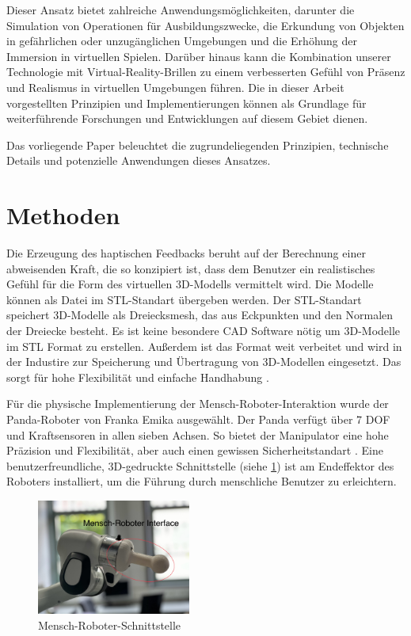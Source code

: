 \documentclass[conference]{IEEEtran}
\begin{document}
Dieser Ansatz bietet zahlreiche Anwendungsmöglichkeiten, darunter die Simulation von Operationen für Ausbildungszwecke, die Erkundung von Objekten in gefährlichen oder unzugänglichen Umgebungen und die Erhöhung der Immersion in virtuellen Spielen. Darüber hinaus kann die Kombination unserer Technologie mit Virtual-Reality-Brillen zu einem verbesserten Gefühl von Präsenz und Realismus in virtuellen Umgebungen führen. Die in dieser Arbeit vorgestellten Prinzipien und Implementierungen können als Grundlage für weiterführende Forschungen und Entwicklungen auf diesem Gebiet dienen.

Das vorliegende Paper beleuchtet die zugrundeliegenden Prinzipien, technische Details und potenzielle Anwendungen dieses Ansatzes.


\section{Methoden}
Die Erzeugung des haptischen Feedbacks beruht auf der Berechnung einer abweisenden Kraft, die so konzipiert ist, dass dem Benutzer ein realistisches Gefühl für die Form des virtuellen 3D-Modells vermittelt wird. Die Modelle können als Datei im STL-Standart übergeben werden. Der STL-Standart speichert 3D-Modelle als Dreiecksmesh, das aus Eckpunkten und den Normalen der Dreiecke besteht. Es ist keine besondere CAD Software nötig um 3D-Modelle im STL Format zu erstellen. Außerdem ist das Format weit verbeitet und wird in der Industire zur Speicherung und Übertragung von 3D-Modellen eingesetzt. Das sorgt für hohe Flexibilität und einfache Handhabung \autocite{WasIstSTLDatei2017}.

Für die physische Implementierung der Mensch-Roboter-Interaktion wurde der Panda-Roboter von Franka Emika ausgewählt. Der Panda verfügt über 7 DOF und Kraftsensoren in allen sieben Achsen. So bietet der Manipulator eine hohe Präzision und Flexibilität, aber auch einen gewissen Sicherheitstandart \cite{pandaDatasheet}. Eine benutzerfreundliche, 3D-gedruckte Schnittstelle (siehe \ref{fig:MRinterface}) ist am Endeffektor des Roboters installiert, um die Führung durch menschliche Benutzer zu erleichtern.  

\begin{figure}
    \centering
    \includegraphics[width=0.45\textwidth]{pics/interface.jpeg}
    \caption{Mensch-Roboter-Schnittstelle}
    \label{fig:MRinterface}
\end{figure}
\end{document}
